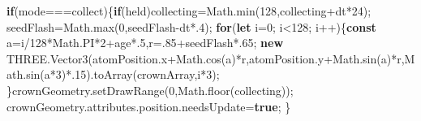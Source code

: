 \documentclass[
  canadien,
  11pt,
  letterpaper,
]{article}
\newenvironment{Shaded}{}{}
\newcommand{\AttributeTok}[1]{\textcolor[rgb]{0.49,0.56,0.16}{#1}}
\newcommand{\BuiltInTok}[1]{\textcolor[rgb]{0.00,0.50,0.00}{#1}}
\newcommand{\ConstantTok}[1]{\textcolor[rgb]{0.53,0.00,0.00}{#1}}
\newcommand{\ControlFlowTok}[1]{\textcolor[rgb]{0.00,0.44,0.13}{\textbf{#1}}}
\newcommand{\DecValTok}[1]{\textcolor[rgb]{0.25,0.63,0.44}{#1}}
\newcommand{\FunctionTok}[1]{\textcolor[rgb]{0.02,0.16,0.49}{#1}}
\newcommand{\KeywordTok}[1]{\textcolor[rgb]{0.00,0.44,0.13}{\textbf{#1}}}
\newcommand{\NormalTok}[1]{#1}
\newcommand{\OperatorTok}[1]{\textcolor[rgb]{0.40,0.40,0.40}{#1}}
\newcommand{\StringTok}[1]{\textcolor[rgb]{0.25,0.44,0.63}{#1}}
\begin{document}
\begin{Shaded}
\begin{Highlighting}[]
\ControlFlowTok{if}\NormalTok{(mode}\OperatorTok{===}\StringTok{\textquotesingle{}collect\textquotesingle{}}\NormalTok{)\{}\ControlFlowTok{if}\NormalTok{(held)collecting}\OperatorTok{=}\BuiltInTok{Math}\OperatorTok{.}\FunctionTok{min}\NormalTok{(}\DecValTok{128}\OperatorTok{,}\NormalTok{collecting}\OperatorTok{+}\NormalTok{dt}\OperatorTok{*}\DecValTok{24}\NormalTok{)}\OperatorTok{;}
\NormalTok{seedFlash}\OperatorTok{=}\BuiltInTok{Math}\OperatorTok{.}\FunctionTok{max}\NormalTok{(}\DecValTok{0}\OperatorTok{,}\NormalTok{seedFlash}\OperatorTok{{-}}\NormalTok{dt}\OperatorTok{*.}\DecValTok{4}\NormalTok{)}\OperatorTok{;}
\ControlFlowTok{for}\NormalTok{(}\KeywordTok{let}\NormalTok{ i}\OperatorTok{=}\DecValTok{0}\OperatorTok{;}
\NormalTok{i}\OperatorTok{\textless{}}\DecValTok{128}\OperatorTok{;}
\NormalTok{i}\OperatorTok{++}\NormalTok{)\{}\KeywordTok{const}\NormalTok{ a}\OperatorTok{=}\NormalTok{i}\OperatorTok{/}\DecValTok{128}\OperatorTok{*}\BuiltInTok{Math}\OperatorTok{.}\ConstantTok{PI}\OperatorTok{*}\DecValTok{2}\OperatorTok{+}\NormalTok{age}\OperatorTok{*.}\DecValTok{5}\OperatorTok{,}\NormalTok{r}\OperatorTok{=.}\DecValTok{85}\OperatorTok{+}\NormalTok{seedFlash}\OperatorTok{*.}\DecValTok{65}\OperatorTok{;}
\KeywordTok{new}\NormalTok{ THREE}\OperatorTok{.}\FunctionTok{Vector3}\NormalTok{(atomPosition}\OperatorTok{.}\AttributeTok{x}\OperatorTok{+}\BuiltInTok{Math}\OperatorTok{.}\FunctionTok{cos}\NormalTok{(a)}\OperatorTok{*}\NormalTok{r}\OperatorTok{,}\NormalTok{atomPosition}\OperatorTok{.}\AttributeTok{y}\OperatorTok{+}\BuiltInTok{Math}\OperatorTok{.}\FunctionTok{sin}\NormalTok{(a)}\OperatorTok{*}\NormalTok{r}\OperatorTok{,}\BuiltInTok{Math}\OperatorTok{.}\FunctionTok{sin}\NormalTok{(a}\OperatorTok{*}\DecValTok{3}\NormalTok{)}\OperatorTok{*.}\DecValTok{15}\NormalTok{)}\OperatorTok{.}\FunctionTok{toArray}\NormalTok{(crownArray}\OperatorTok{,}\NormalTok{i}\OperatorTok{*}\DecValTok{3}\NormalTok{)}\OperatorTok{;}
\NormalTok{\}crownGeometry}\OperatorTok{.}\FunctionTok{setDrawRange}\NormalTok{(}\DecValTok{0}\OperatorTok{,}\BuiltInTok{Math}\OperatorTok{.}\FunctionTok{floor}\NormalTok{(collecting))}\OperatorTok{;}
\NormalTok{crownGeometry}\OperatorTok{.}\AttributeTok{attributes}\OperatorTok{.}\AttributeTok{position}\OperatorTok{.}\AttributeTok{needsUpdate}\OperatorTok{=}\KeywordTok{true}\OperatorTok{;}
\NormalTok{\}}
\end{Highlighting}
\end{Shaded}
\end{document}
